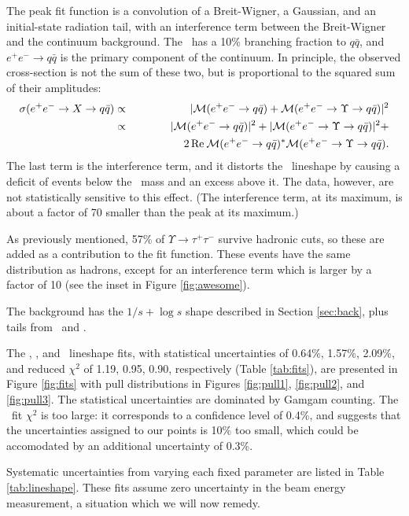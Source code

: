 \documentclass[aps,prd,preprint,superscriptaddress,tightenlines,nofootinbib,floatfix]{revtex4}
\begin{document}
The peak fit function is a convolution of a Breit-Wigner, a Gaussian,
and an initial-state radiation tail, with an interference term between
the Breit-Wigner and the continuum background.  The \ups\ has a 10\%
branching fraction to $q\bar{q}$, and $e^+e^- \to q\bar{q}$ is the
primary component of the continuum.  In principle, the observed
cross-section is not the sum of these two, but is proportional to the
squared sum of their amplitudes:
\begin{eqnarray}
  \sigma(e^+e^- \to X \to q\bar{q}) &\propto& |\mathcal{M}(e^+e^- \to q\bar{q}) + \mathcal{M}(e^+e^- \to \Upsilon \to q\bar{q})|^2 \\
  &\propto& |\mathcal{M}(e^+e^- \to q\bar{q})|^2 + |\mathcal{M}(e^+e^- \to \Upsilon \to q\bar{q})|^2 + \nonumber \\
  & & \mbox{\hspace{1.5 cm}} 2 \, \mathrm{Re\:} \mathcal{M}(e^+e^- \to q\bar{q})^* \mathcal{M}(e^+e^- \to \Upsilon \to q\bar{q}) \mbox{.}
\end{eqnarray}
The last term is the interference term, and it distorts the \ups\
lineshape by causing a deficit of events below the \ups\ mass and an
excess above it.  The data, however, are not statistically sensitive
to this effect.  (The interference term, at its maximum, is about a
factor of 70 smaller than the peak at its maximum.)

As previously mentioned, 57\% of $\Upsilon \to \tau^+\tau^-$ survive
hadronic cuts, so these are added as a contribution to the fit
function.  These events have the same distribution as hadrons, except
for an interference term which is larger by a factor of 10 (see the
inset in Figure \ref{fig:awesome}).

The background has the $1/s + \log s$ shape described in Section
\ref{sec:back}, plus tails from \uone\ and \utwo.

The \uone, \utwo, and \uthree\ lineshape fits, with statistical
uncertainties of 0.64\%, 1.57\%, 2.09\%, and reduced $\chi^2$ of 1.19,
0.95, 0.90, respectively (Table \ref{tab:fits}), are presented in
Figure \ref{fig:fits} with pull distributions in Figures
\ref{fig:pull1}, \ref{fig:pull2}, and \ref{fig:pull3}.  The
statistical uncertainties are dominated by Gamgam counting.  The
\uone\ fit $\chi^2$ is too large: it corresponds to a confidence level
of 0.4\%, and suggests that the uncertainties assigned to our points
is 10\% too small, which could be accomodated by an additional
uncertainty of 0.3\%.

Systematic uncertainties from varying each fixed parameter are listed
in Table \ref{tab:lineshape}.  These fits assume zero uncertainty in
the beam energy measurement, a situation which we will now remedy.
\end{document}
